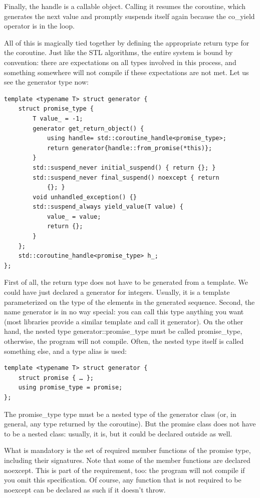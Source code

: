 Finally, the handle is a callable object. Calling it resumes the coroutine, which generates the next value and promptly suspends itself again because the co\_yield operator is in the loop. 

All of this is magically tied together by defining the appropriate return type for the coroutine. Just like the STL algorithms, the entire system is bound by convention: there are expectations on all types involved in this process, and something somewhere will not compile if these expectations are not met. Let us see the generator type now:

\begin{lstlisting}[style=styleCXX]
template <typename T> struct generator {
	struct promise_type {
		T value_ = -1;
		generator get_return_object() {
			using handle= std::coroutine_handle<promise_type>;
			return generator{handle::from_promise(*this)};
		}
		std::suspend_never initial_suspend() { return {}; }
		std::suspend_never final_suspend() noexcept { return 
			{}; }
		void unhandled_exception() {}
		std::suspend_always yield_value(T value) {
			value_ = value;
			return {};
		}
	};
	std::coroutine_handle<promise_type> h_;
};
\end{lstlisting}

First of all, the return type does not have to be generated from a template. We could have just declared a generator for integers. Usually, it is a template parameterized on the type of the elements in the generated sequence. Second, the name generator is in no way special: you can call this type anything you want (most libraries provide a similar template and call it generator). On the other hand, the nested type generator::promise\_type must be called promise\_type, otherwise, the program will not compile. Often,  the nested type itself is called something else, and a type alias is used:

\begin{lstlisting}[style=styleCXX]
template <typename T> struct generator {
	struct promise { … };
	using promise_type = promise;
};
\end{lstlisting}

The promise\_type type must be a nested type of the generator class (or, in general, any type returned by the coroutine). But the promise class does not have to be a nested class: usually, it is, but it could be declared outside as well. 

What is mandatory is the set of required member functions of the promise type, including their signatures. Note that some of the member functions are declared noexcept. This is part of the requirement, too: the program will not compile if you omit this specification. Of course, any function that is not required to be noexcept can be declared as such if it doesn't throw. 

